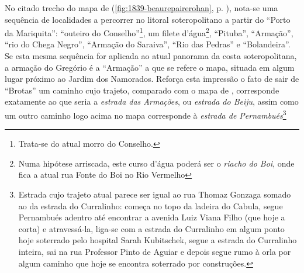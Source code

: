 
No citado trecho do mapa de  (\autoref{fig:1839-beaurepairerohan}, p. \pageref{fig:1839-beaurepairerohan}), nota-se uma sequência de localidades a percorrer no litoral soteropolitano a partir do ``Porto da Mariquita'': ``outeiro do Conselho''\footnote{Trata-se do atual morro do Conselho.}, um filete d'água\footnote{Numa hipótese arriscada, este curso d'água poderá ser o \textit{riacho do Boi}, onde fica a atual rua Fonte do Boi no Rio Vermelho}, ``Pituba'', ``Armação'', ``rio do Chega Negro'', ``Armação do Saraiva'', ``Rio das Pedras'' e ``Bolandeira''. Se esta mesma sequência for aplicada ao atual panorama da costa soteropolitana, a armação do Gregório é a ``Armação'' a que se refere o mapa, situada em algum lugar próximo ao Jardim dos Namorados. Reforça esta impressão o fato de sair de ``Brotas'' um caminho cujo trajeto, comparado com o mapa de , corresponde exatamente ao que seria a \textit{estrada das Armações}, ou \textit{estrada do Beiju}, assim como um outro caminho logo acima no mapa corresponde à \textit{estrada de Pernambués}\footnote{Estrada cujo trajeto atual parece ser igual ao rua Thomaz Gonzaga somado ao da estrada do Curralinho: começa no topo da ladeira do Cabula, segue Pernambués adentro até encontrar a avenida Luiz Viana Filho (que hoje a corta) e atravessá-la, liga-se com a estrada do Curralinho em algum ponto hoje soterrado pelo hospital Sarah Kubitschek, segue a estrada do Curralinho inteira, sai na rua Professor Pinto de Aguiar e depois segue rumo à orla por algum caminho que hoje se encontra soterrado por construções.}